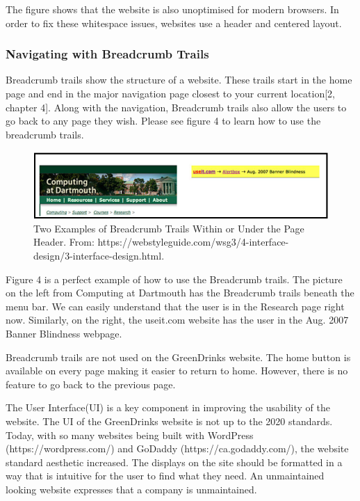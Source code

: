 \documentclass[12pt]{article}
\begin{document}
	
The figure shows that the website is also unoptimised for modern browsers. In order to fix these whitespace issues, websites use a header and centered layout.

\subsubsection*{Navigating with Breadcrumb Trails}	
Breadcrumb trails show the structure of a website. These trails start in the home page and end in the major navigation page closest to your current location[2, chapter 4]. Along with the navigation, Breadcrumb trails also allow the users to go back to any page they wish. Please see figure 4 to learn how to use the breadcrumb trails.

\begin{figure}[ht]
\centering
\includegraphics[width=1.0\textwidth]{f4}
\caption[Examples of Breadcrumb Trails]{Two Examples of Breadcrumb Trails Within or Under the Page Header. 
From:  https://webstyleguide.com/wsg3/4-interface-design/3-interface-design.html\footnotemark.}
\end{figure} 

Figure 4 is a perfect example of how to use the Breadcrumb trails. The picture on the left from Computing at Dartmouth has the Breadcrumb trails beneath the menu bar. We can easily understand that the user is in the Research page right now. Similarly, on the right, the useit.com website has the user in the Aug. 2007 Banner Blindness webpage.

Breadcrumb trails are not used on the GreenDrinks website. The home button is available on every page making it easier to return to home. However, there is no feature to go back to the previous page.

The User Interface(UI) is a key component in improving the usability of the website. The UI of the GreenDrinks website is not up to the 2020 standards.  Today, with so many websites being built with WordPress (https://wordpress.com/) and GoDaddy (https://ca.godaddy.com/), the website standard aesthetic increased.  The displays on the site should be formatted in a way that is intuitive for the user to find what they need.  An unmaintained looking website expresses that a company is unmaintained.
\end{document}
